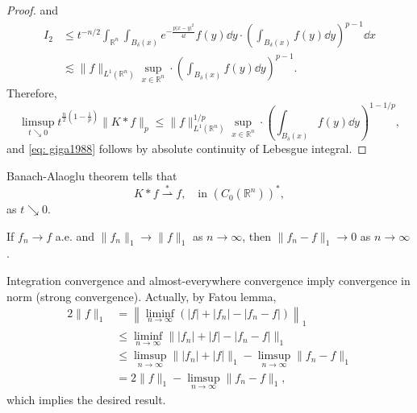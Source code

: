 \begin{proof}
	and 
	\begin{align*}
		I_2
		&\leq t^{-n/2} \int_{\mathbb R^n}\int_{B_\delta(x)}e^{-\frac{p|x-y|^2}{4t}}f(y)\dd y
		\cdot \left(\int_{B_\delta(x)}f(y)\dd y\right)^{p-1}\dd x\\
		&\lesssim \|f\|_{L^1(\mathbb R^n)}\sup_{x\in\mathbb R^n} \cdot \left(\int_{B_\delta(x)}f(y)\dd y\right)^{p-1}.
	\end{align*}
	Therefore,
	\[
	\limsup_{t\searrow0}	t^{\frac{n}{2}\left(1-\frac1p\right)}\|K*f\|_p 
	\leq \|f\|^{1/p}_{L^1(\mathbb R^n)}\sup_{x\in\mathbb R^n} 
	\cdot \left(\int_{B_\delta(x)}f(y)\dd y\right)^{1-1/p},
	\]
	and \eqref{eq: giga1988} follows by absolute continuity of Lebesgue integral.
\end{proof}

\begin{remark}
	Banach-Alaoglu theorem tells that 
	\[
	K*f \overset{\ast}{\rightharpoonup} f,\quad \text{in } (C_0(\mathbb R^n))^*,
	\]
	as $t\searrow0$.

	If $f_n\to f$ a.e. and $\|f_n\|_1\to\|f\|_1$ as $n\to\infty$, 
	then $\|f_n-f\|_1 \to 0$ as $n\to\infty$.

	Integration convergence and almost-everywhere convergence imply convergence in norm (strong convergence).
	Actually, by Fatou lemma,
	\begin{align*}
	2\|f\|_1 &= \left\|\liminf_{n\to\infty}(|f|+|f_n|-|f_n-f|)\right\|_1\\
	&\leq \liminf_{n\to\infty}\||f_n|+|f|-|f_n-f|\|_1\\
	&\leq \limsup_{n\to\infty}\||f_n|+|f|\|_1 - \limsup_{n\to\infty}\|f_n-f\|_1\\
	&= 2\|f\|_1 - \limsup_{n\to\infty}\|f_n-f\|_1,
	\end{align*}
	which implies the desired result.	
\end{remark}

